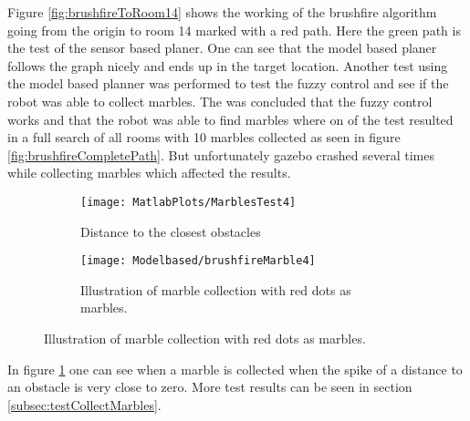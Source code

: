\documentclass[../Head/Main.tex]{subfiles}
\begin{document}
Figure \ref{fig:brushfireToRoom14} shows the working of the brushfire algorithm going from the origin to room 14 marked with a red path. Here the green path is the test of the sensor based planer. One can see that the model based planer follows the graph nicely and ends up in the target location. Another test using the model based planner was performed to test the fuzzy control and see if the robot was able to collect marbles. The was concluded that the fuzzy control works and that the robot was able to find marbles where on of the test resulted in a full search of all rooms with 10 marbles collected as seen in figure \ref{fig:brushfireCompletePath}. But unfortunately gazebo crashed several times while collecting marbles which affected the results.
  \begin{figure}[H]
   \begin{subfigure}[b]{0.49\textwidth}
    \centering
    \texttt{[image: MatlabPlots/MarblesTest4]}
    \caption{Distance to the closest obstacles}
    \label{fig:matlabPlotMarbletest14}
  \end{subfigure}
  \hfill
   \begin{subfigure}[b]{0.49\textwidth}
    \centering
    \texttt{[image: Modelbased/brushfireMarble4]}
    \caption{Illustration of marble collection with red dots as marbles.}
    \label{fig:brushfireMarbleFindingTest}
  \end{subfigure}
  \end{figure}  

In figure \ref{fig:matlabPlotMarbletest14} one can see when a marble is collected when the spike of a distance to an obstacle is very close to zero. More test results can be seen in section \ref{subsec:testCollectMarbles}.
\end{document}
